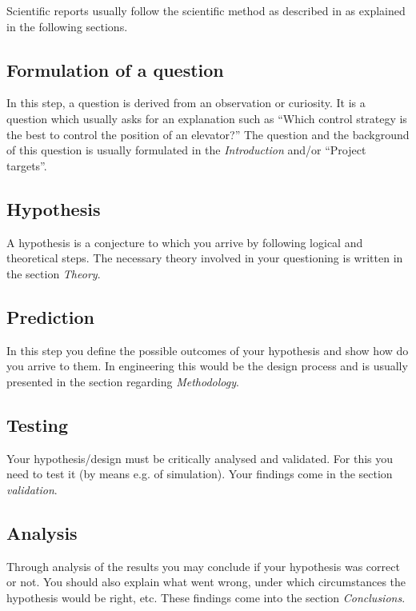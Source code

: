 \documentclass[a4paper, 10pt]{IEEEtran}
\begin{document}
	Scientific reports usually follow the scientific method as described in \cite{scientificMethod} as explained in the following sections.
	
	\subsection{Formulation of a question}
	
	In this step, a question is derived from an observation or curiosity. It is a question which usually asks for an explanation such as ``Which control strategy is the best to control the position of an elevator?'' The question and the background of this question is usually formulated in the \emph{Introduction} and/or ``Project targets''.
	
	\subsection{Hypothesis}
	
	A hypothesis is a conjecture to which you arrive by following logical and theoretical steps. The necessary theory involved in your questioning is written in the section \emph{Theory}.
	
	\subsection{Prediction}
	
	In this step you define the possible outcomes of your hypothesis and show how do you arrive to them. In engineering this would be the design process and is usually presented in the section regarding \emph{Methodology}.
	
	\subsection{Testing}
	
	Your hypothesis/design must be critically analysed and validated. For this you need to test it (by means e.g. of simulation). Your findings come in the section \emph{validation}.
	
	\subsection{Analysis}
	
	Through analysis of the results you may conclude if your hypothesis was correct or not. You should also explain what went wrong, under which circumstances the hypothesis would be right, etc. These findings come into the section \emph{Conclusions}.
	
\end{document}
